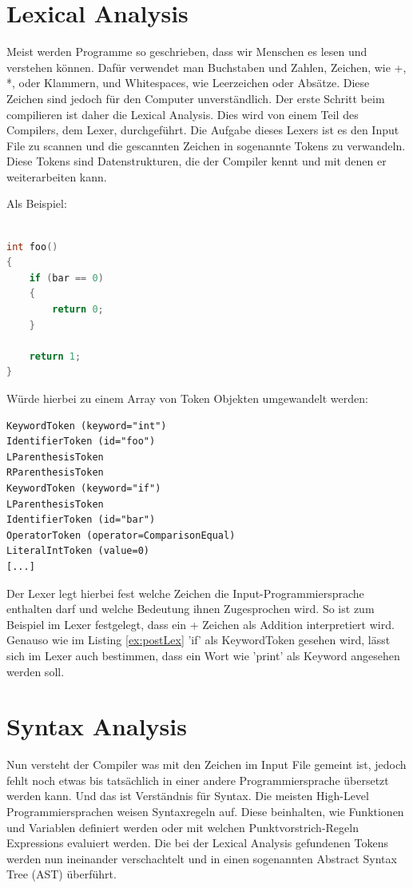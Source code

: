 \section{Lexical Analysis}
Meist werden Programme so geschrieben, dass wir Menschen es lesen und verstehen können. Dafür verwendet man Buchstaben und Zahlen, Zeichen, wie +, *, oder Klammern, und Whitespaces, wie Leerzeichen oder Absätze.
Diese Zeichen sind jedoch für den Computer unverständlich. Der erste Schritt beim compilieren ist daher die Lexical Analysis. Dies wird von einem Teil des Compilers, dem Lexer, durchgeführt.
Die Aufgabe dieses Lexers ist es den Input File zu scannen und die gescannten Zeichen in sogenannte Tokens zu verwandeln. Diese Tokens sind Datenstrukturen, die der Compiler kennt und mit denen er weiterarbeiten kann.

Als Beispiel:

\begin{lstlisting}[language=C, label=ex:preLex, caption=C code vor Lexical Analysis]

int foo()
{
    if (bar == 0)
    {
        return 0;
    }

    return 1;
}

\end{lstlisting}

Würde hierbei zu einem Array von Token Objekten umgewandelt werden:

\begin{lstlisting}[label=ex:postLex, caption=Tokens nach Lexical Analysis]
KeywordToken (keyword="int")
IdentifierToken (id="foo")
LParenthesisToken
RParenthesisToken
KeywordToken (keyword="if")
LParenthesisToken
IdentifierToken (id="bar")
OperatorToken (operator=ComparisonEqual)
LiteralIntToken (value=0)
[...]
\end{lstlisting}

Der Lexer legt hierbei fest welche Zeichen die Input-Programmiersprache enthalten darf und welche Bedeutung ihnen Zugesprochen wird. So ist zum Beispiel im Lexer festgelegt, dass ein + Zeichen als Addition interpretiert wird.
Genauso wie im Listing \ref{ex:postLex} 'if' als KeywordToken gesehen wird, lässt sich im Lexer auch bestimmen, dass ein Wort wie 'print' als Keyword angesehen werden soll.

\section{Syntax Analysis}
Nun versteht der Compiler was mit den Zeichen im Input File gemeint ist, jedoch fehlt noch etwas bis tatsächlich in einer andere Programmiersprache übersetzt werden kann. Und das ist Verständnis für Syntax.
Die meisten High-Level Programmiersprachen weisen Syntaxregeln auf. Diese beinhalten, wie Funktionen und Variablen definiert werden oder mit welchen Punktvorstrich-Regeln Expressions evaluiert werden.
Die bei der Lexical Analysis gefundenen Tokens werden nun ineinander verschachtelt und in einen sogenannten Abstract Syntax Tree (AST) überführt.

